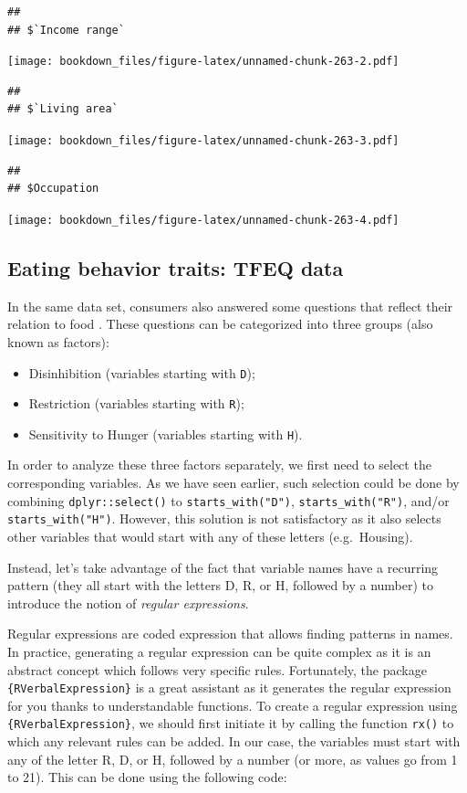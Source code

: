 \documentclass[
]{krantz}
\providecommand{\tightlist}{%
  \setlength{\itemsep}{0pt}\setlength{\parskip}{0pt}}
\begin{document}
\begin{verbatim}
## 
## $`Income range`
\end{verbatim}

\texttt{[image: bookdown\_files/figure-latex/unnamed-chunk-263-2.pdf]}

\begin{verbatim}
## 
## $`Living area`
\end{verbatim}

\texttt{[image: bookdown\_files/figure-latex/unnamed-chunk-263-3.pdf]}

\begin{verbatim}
## 
## $Occupation
\end{verbatim}

\texttt{[image: bookdown\_files/figure-latex/unnamed-chunk-263-4.pdf]}

\hypertarget{regex}{%
\subsection{Eating behavior traits: TFEQ data}\label{regex}}

In the same data set, consumers also answered some questions that reflect their relation to food \citep{stunkard1985}. These questions can be categorized into three groups (also known as factors):

\begin{itemize}
\tightlist
\item
  Disinhibition (variables starting with \texttt{D});
\item
  Restriction (variables starting with \texttt{R});
\item
  Sensitivity to Hunger (variables starting with \texttt{H}).
\end{itemize}

In order to analyze these three factors separately, we first need to select the corresponding variables. As we have seen earlier, such selection could be done by combining \texttt{dplyr::select()} to \texttt{starts\_with("D")}, \texttt{starts\_with("R")}, and/or \texttt{starts\_with("H")}. However, this solution is not satisfactory as it also selects other variables that would start with any of these letters (e.g.~Housing).

Instead, let's take advantage of the fact that variable names have a recurring pattern (they all start with the letters D, R, or H, followed by a number) to introduce the notion of \emph{regular expressions}.

Regular expressions are coded expression that allows finding patterns in names. In practice, generating a regular expression can be quite complex as it is an abstract concept which follows very specific rules. Fortunately, the package \texttt{\{RVerbalExpression\}} is a great assistant as it generates the regular expression for you thanks to understandable functions.
To create a regular expression using \texttt{\{RVerbalExpression\}}, we should first initiate it by calling the function \texttt{rx()} to which any relevant rules can be added. In our case, the variables must start with any of the letter R, D, or H, followed by a number (or more, as values go from 1 to 21). This can be done using the following code:
\end{document}
